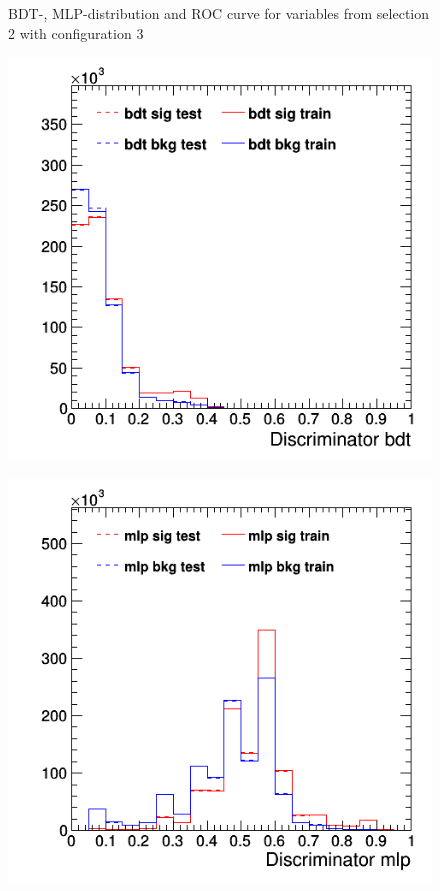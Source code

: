 \documentclass[11pt]{scrartcl}
\begin{document}
\begin{figure}[H]
	\caption{BDT-, MLP-distribution and ROC curve for variables from selection 2 with configuration 3}
	 \label{fig:ROC_s2_config3}	
	\end{figure}
	
	
	\begin{figure}[H]
	\centering
	\begin{minipage}{.5\textwidth}
	  \centering
	  \includegraphics[width=0.75\linewidth]{figures/MVA/select3/config1/discriminator_bdt.png}
	  \label{fig:distr_s3_config1_bdt}
	\end{minipage}%
	\begin{minipage}{.5\textwidth}
	  \centering
	  \includegraphics[width=0.75\linewidth]{figures/MVA/select3/config1/discriminator_mlp.png}

\end{minipage}
\end{figure}
\end{document}

